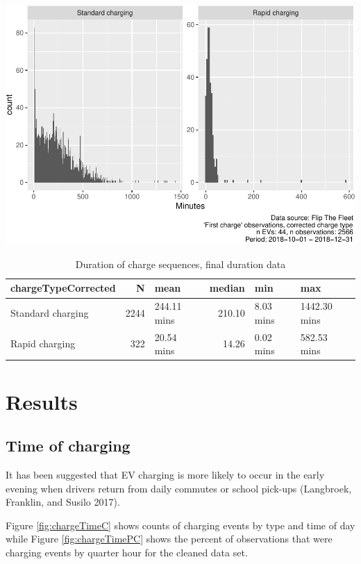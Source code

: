 \documentclass[]{article}
\begin{document}
\includegraphics{EVBB_report_v1_files/figure-latex/longDuration-1.pdf}

\begin{table}[t]

\caption{\label{tab:longDuration}Duration of charge sequences, final duration data}
\centering
\begin{tabular}{l|r|l|r|l|l}
\hline
chargeTypeCorrected & N & mean & median & min & max\\
\hline
Standard charging & 2244 & 244.11 mins & 210.10 & 8.03 mins & 1442.30 mins\\
\hline
Rapid charging & 322 & 20.54 mins & 14.26 & 0.02 mins & 582.53 mins\\
\hline
\end{tabular}
\end{table}

\hypertarget{results}{%
\section{Results}\label{results}}

\hypertarget{time-of-charging}{%
\subsection{Time of charging}\label{time-of-charging}}

It has been suggested that EV charging is more likely to occur in the early evening when drivers return from daily commutes or school pick-ups (Langbroek, Franklin, and Susilo 2017).

Figure \ref{fig:chargeTimeC} shows counts of charging events by type and time of day while Figure \ref{fig:chargeTimePC} shows the percent of observations that were charging events by quarter hour for the cleaned data set.
\end{document}
